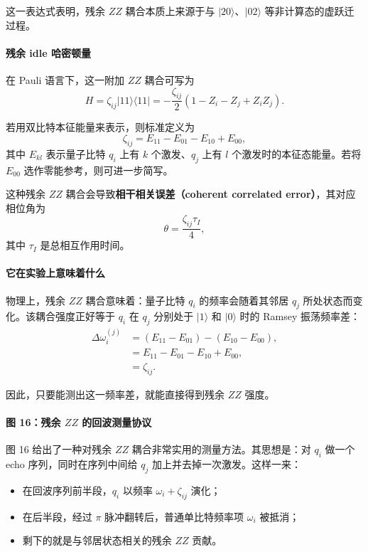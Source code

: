 \documentclass[12pt,a4paper,oneside]{ctexbook}
\begin{document}
这一表达式表明，残余 \(ZZ\) 耦合本质上来源于与 \(|20\rangle\)、\(|02\rangle\) 等非计算态的虚跃迁过程。

\paragraph{残余 idle 哈密顿量}
在 Pauli 语言下，这一附加 \(ZZ\) 耦合可写为
\begin{equation}
H
=
\zeta_{ij}|11\rangle\langle 11|
=
-\frac{\zeta_{ij}}{2}\left(1-Z_i-Z_j+Z_iZ_j\right).
\tag{76}
\end{equation}

若用双比特本征能量来表示，则标准定义为
\begin{equation}
\zeta_{ij}
=
E_{11}-E_{01}-E_{10}+E_{00},
\tag{77}
\end{equation}
其中 \(E_{kl}\) 表示量子比特 \(q_i\) 上有 \(k\) 个激发、\(q_j\) 上有 \(l\) 个激发时的本征态能量。若将 \(E_{00}\) 选作零能参考，则可进一步简写。

这种残余 \(ZZ\) 耦合会导致\textbf{相干相关误差（coherent correlated error）}，其对应相位角为
\begin{equation}
\theta=\frac{\zeta_{ij}\tau_I}{4},
\tag{78}
\end{equation}
其中 \(\tau_I\) 是总相互作用时间。

\paragraph{它在实验上意味着什么}
物理上，残余 \(ZZ\) 耦合意味着：量子比特 \(q_i\) 的频率会随着其邻居 \(q_j\) 所处状态而变化。该耦合强度正好等于 \(q_i\) 在 \(q_j\) 分别处于 \(|1\rangle\) 和 \(|0\rangle\) 时的 Ramsey 振荡频率差：
\begin{align}
\Delta \omega_i^{(j)}
&=
(E_{11}-E_{01})-(E_{10}-E_{00}),
\tag{79}\\
&=
E_{11}-E_{01}-E_{10}+E_{00},
\tag{80}\\
&=
\zeta_{ij}.
\tag{81}
\end{align}

因此，只要能测出这一频率差，就能直接得到残余 \(ZZ\) 强度。

\paragraph{图 16：残余 \(ZZ\) 的回波测量协议}
图 16 给出了一种对残余 \(ZZ\) 耦合非常实用的测量方法。其思想是：对 \(q_i\) 做一个 echo 序列，同时在序列中间给 \(q_j\) 加上并去掉一次激发。这样一来：
\begin{itemize}
    \item 在回波序列前半段，\(q_i\) 以频率 \(\omega_i+\zeta_{ij}\) 演化；
    \item 在后半段，经过 \(\pi\) 脉冲翻转后，普通单比特频率项 \(\omega_i\) 被抵消；
    \item 剩下的就是与邻居状态相关的残余 \(ZZ\) 贡献。
\end{itemize}
\end{document}
